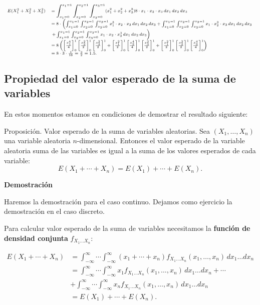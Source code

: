 \documentclass[]{book}
\begin{document}
\[
\scriptsize{
\begin{array}{rl}
E(X_1^2+X_2^2+X_3^2) & \displaystyle=\int_{x_1=0}^{x_1=1} \int_{x_2=0}^{x_2=1}\int_{x_3=0}^{x_3=1} (x_1^2+x_2^2+x_3^2) 8\cdot x_1\cdot x_2\cdot  x_3 \,dx_1\, dx_2\, dx_3\\ & =8\cdot \left(\int_{x_1=0}^{x_1=1} \int_{x_2=0}^{x_2=1}\int_{x_3=0}^{x_3=1}   x_1^3\cdot  x_2\cdot  x_3 \,dx_1\, dx_2\, dx_3 + \int_{x_1=0}^{x_1=1} \int_{x_2=0}^{x_2=1}\int_{x_3=0}^{x_3=1}   x_1 \cdot x_2^3 \cdot x_3 \,dx_1\, dx_2\, dx_3 \right.\\ & \left. + \int_{x_1=0}^{x_1=1} \int_{x_2=0}^{x_2=1}\int_{x_3=0}^{x_3=1}   x_1\cdot  x_2\cdot  x_3^3 \,dx_1\, dx_2\, dx_3\right) \\ & =
8\left(\left[\frac{x_1^4}{4}\right]_0^1 \left[\frac{x_2^2}{2}\right]_0^1 \left[\frac{x_3^2}{2}\right]_0^1 + \left[\frac{x_1^2}{2}\right]_0^1 \left[\frac{x_2^4}{4}\right]_0^1 \left[\frac{x_3^2}{2}\right]_0^1 + \left[\frac{x_1^2}{2}\right]_0^1 \left[\frac{x_2^2}{2}\right]_0^1 \left[\frac{x_3^4}{4}\right]_0^1\right) \\ & =8\cdot 3\cdot \frac{1}{16}=\frac{3}{2}=1.5.
\end{array}}
\]

\hypertarget{propiedad-del-valor-esperado-de-la-suma-de-variables}{%
\subsection{Propiedad del valor esperado de la suma de variables}\label{propiedad-del-valor-esperado-de-la-suma-de-variables}}

En estos momentos estamos en condiciones de demostrar el resultado siguiente:

Proposición. Valor esperado de la suma de variables aleatorias.
Sea \((X_1,\ldots,X_n)\) una variable aleatoria \(n\)-dimensional. Entonces el valor esperado de la variable aleatoria suma de las variables es igual a la suma de los valores esperados de cada variable:
\[
E(X_1+\cdots + X_n)=E(X_1)+\cdots + E(X_n).
\]

\textbf{Demostración}

Haremos la demostración para el caso continuo. Dejamos como ejercicio la demostración en el caso discreto.

Para calcular valor esperado de la suma de variables necesitamos la \textbf{función de densidad conjunta} \(f_{X_1\ldots X_n}\):

\[
\begin{array}{rl}
E(X_1+\cdots + X_n) & = \int_{-\infty}^\infty\cdots\int_{-\infty}^\infty (x_1+\cdots + x_n)f_{X_1\ldots X_n}(x_1,\ldots,x_n)\,dx_1\ldots dx_n \\ & = \int_{-\infty}^\infty\cdots\int_{-\infty}^\infty x_1f_{X_1\ldots X_n}(x_1,\ldots,x_n)\,dx_1\ldots dx_n+ \cdots \\ & + \int_{-\infty}^\infty\cdots\int_{-\infty}^\infty x_n f_{X_1\ldots X_n}(x_1,\ldots,x_n)\,dx_1\ldots dx_n \\ & = E(X_1)+\cdots + E(X_n).
\end{array}
\]
\end{document}
